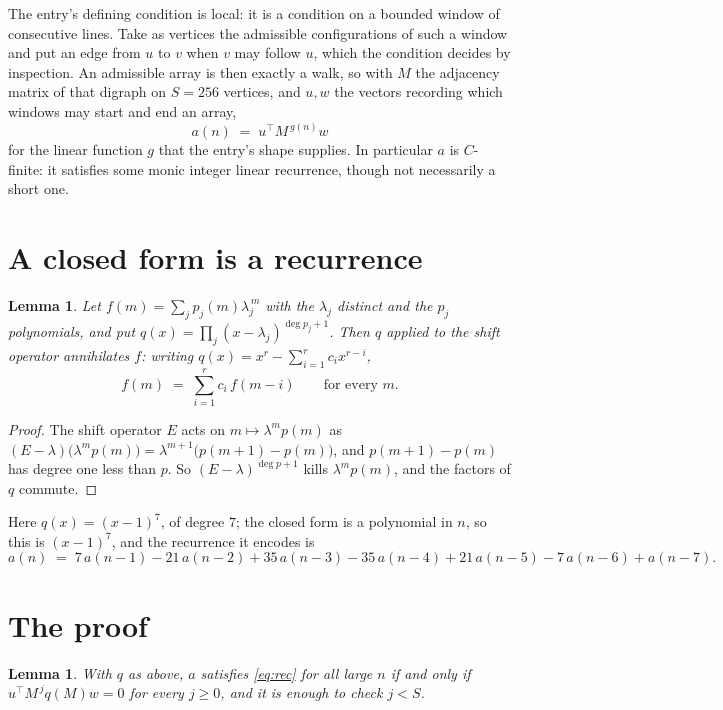\documentclass[11pt,a4paper]{article}
\theoremstyle{plain}
\newtheorem{lemma}[theorem]{Lemma}
\theoremstyle{definition}
\begin{document}
The entry's defining condition is local: it is a condition on a bounded window of consecutive lines. Take as vertices the
admissible configurations of such a window and put an edge from $u$ to $v$ when $v$ may
follow $u$, which the condition decides by inspection. An admissible array is then exactly a
walk, so with $M$ the adjacency matrix of that digraph on $S=256$ vertices, and $u,w$ the
vectors recording which windows may start and end an array,
\[
a(n)\;=\;u^{\!\top}M^{\,g(n)}w
\]
for the linear function $g$ that the entry's shape supplies. In particular $a$ is
$C$-finite: it satisfies some monic integer linear recurrence, though not necessarily a short
one.

\section{A closed form is a recurrence}

\begin{lemma}\label{lem:ann}
Let $f(m)=\sum_{j}p_j(m)\lambda_j^{\,m}$ with the $\lambda_j$ distinct and the $p_j$
polynomials, and put $q(x)=\prod_j(x-\lambda_j)^{\deg p_j+1}$. Then $q$ applied to the shift
operator annihilates $f$: writing $q(x)=x^{r}-\sum_{i=1}^{r}c_ix^{r-i}$,
\[
f(m)\;=\;\sum_{i=1}^{r}c_i\,f(m-i)\qquad\text{for every }m.
\]
\end{lemma}

\begin{proof}
The shift operator $E$ acts on $m\mapsto\lambda^{m}p(m)$ as
$(E-\lambda)\bigl(\lambda^{m}p(m)\bigr)=\lambda^{m+1}\bigl(p(m+1)-p(m)\bigr)$, and
$p(m+1)-p(m)$ has degree one less than $p$. So $(E-\lambda)^{\deg p+1}$ kills
$\lambda^{m}p(m)$, and the factors of $q$ commute.
\end{proof}

Here $q(x)=(x-1)^{7}$, of degree $7$; the closed form is a polynomial in $n$, so this is $(x-1)^{7}$, and the recurrence it encodes is
\begin{equation}\label{eq:rec}
a(n)\;=\;7\,a(n-1) - 21\,a(n-2) + 35\,a(n-3) - 35\,a(n-4) + 21\,a(n-5) - 7\,a(n-6) + a(n-7).
\end{equation}

\section{The proof}

\begin{lemma}\label{lem:crit}
With $q$ as above, $a$ satisfies \eqref{eq:rec} for all large $n$ if and only if
$u^{\!\top}M^{\,j}q(M)w=0$ for every $j\ge0$, and it is enough to check $j<S$.
\end{lemma}
\end{document}
